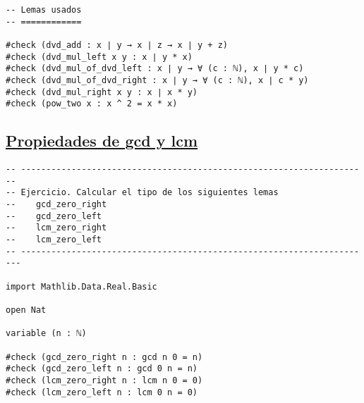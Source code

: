 \begin{verbatim}
-- Lemas usados
-- ============

#check (dvd_add : x ∣ y → x ∣ z → x ∣ y + z)
#check (dvd_mul_left x y : x ∣ y * x)
#check (dvd_mul_of_dvd_left : x ∣ y → ∀ (c : ℕ), x ∣ y * c)
#check (dvd_mul_of_dvd_right : x ∣ y → ∀ (c : ℕ), x ∣ c * y)
#check (dvd_mul_right x y : x ∣ x * y)
#check (pow_two x : x ^ 2 = x * x)
\end{verbatim}

\subsection{\href{./src/Basicos/Propiedades\_de\_gcd\_y\_lcm.lean}{Propiedades de gcd y lcm}}
\label{sec:org5dae9f5}
\begin{verbatim}
-- ---------------------------------------------------------------------
-- Ejercicio. Calcular el tipo de los siguientes lemas
--    gcd_zero_right
--    gcd_zero_left
--    lcm_zero_right
--    lcm_zero_left
-- ----------------------------------------------------------------------

import Mathlib.Data.Real.Basic

open Nat

variable (n : ℕ)

#check (gcd_zero_right n : gcd n 0 = n)
#check (gcd_zero_left n : gcd 0 n = n)
#check (lcm_zero_right n : lcm n 0 = 0)
#check (lcm_zero_left n : lcm 0 n = 0)
\end{verbatim}

